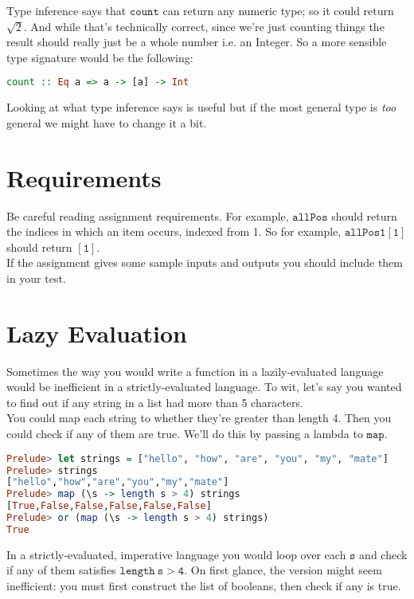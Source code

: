 \documentclass[a4paper,12pt]{article}
\newcommand{\kwa}[1]{\mathtt{#1}}
\begin{document}
\noindent
Type inference says that $\kwa{count}$ can return any numeric type; so it could return $\sqrt 2$. And while that's technically correct, since we're just counting things the result should really just be a whole number i.e. an Integer. So a more sensible type signature would be the following:

\begin{lstlisting}[language=Haskell]
count :: Eq a => a -> [a] -> Int
\end{lstlisting}

\noindent
Looking at what type inference says is useful but if the most general type is \textit{too} general we might have to change it a bit.


\section{Requirements}

\noindent
Be careful reading assignment requirements. For example, $\kwa{allPos}$ should return the indices in which an item occurs, indexed from 1. So for example, $\kwa{allPos 1 [1]}$ should return $\kwa{[1]}$.\\

\noindent
If the assignment gives some sample inputs and outputs you should include them in your test.

\section{Lazy Evaluation}

\noindent
Sometimes the way you would write a function in a lazily-evaluated language would be inefficient in a strictly-evaluated language. To wit, let's say you wanted to find out if any string in a list had more than 5 characters. \\

\noindent
You could map each string to whether they're greater than length 4. Then you could check if any of them are true. We'll do this by passing a lambda to $\kwa{map}$.

\begin{lstlisting}[language=Haskell]
Prelude> let strings = ["hello", "how", "are", "you", "my", "mate"]
Prelude> strings
["hello","how","are","you","my","mate"]
Prelude> map (\s -> length s > 4) strings
[True,False,False,False,False,False]
Prelude> or (map (\s -> length s > 4) strings)
True
\end{lstlisting}

\noindent
In a strictly-evaluated, imperative language you would loop over each $\kwa{s}$ and check if any of them satisfies $\kwa{length~s  > 4}$. On first glance, the version might seem inefficient: you must first construct the list of booleans, then check if any is true. \\
\end{document}
